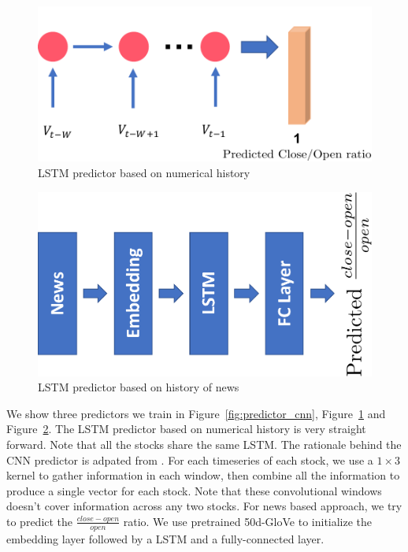 \documentclass[a4paper, 10pt]{article}
\begin{document}
\begin{spacing}{1.2}
    \begin{figure}
      \centering
      \includegraphics[scale=0.5]{predictor_lstm}
      \caption{LSTM predictor based on numerical history}
      \label{fig:predictor_lstm}
    \end{figure}
  
    \begin{figure}
      \centering
      \includegraphics[scale=0.5]{predictor_lstm_news}
      \caption{LSTM predictor based on history of news}
      \label{fig:predictor_lstm_news}
    \end{figure}
    We show three predictors we train in Figure~\ref{fig:predictor_cnn}, Figure~\ref{fig:predictor_lstm} and Figure~\ref{fig:predictor_lstm_news}. The LSTM predictor based on numerical history is very straight forward. Note that all the stocks share the same LSTM. The rationale behind the CNN predictor is adpated from \cite{DBLP:journals/corr/JiangXL17}. For each timeseries of each stock, we use a $1\times3$ kernel to gather information in each window, then combine all the information to produce a single vector for each stock. Note that these convolutional windows doesn't cover information across any two stocks. For news based approach, we try to predict the $\frac{close-open}{open}$ ratio. We use pretrained 50d-GloVe to initialize the embedding layer followed by a LSTM and a fully-connected layer. 
    

\end{spacing}
\end{document}
